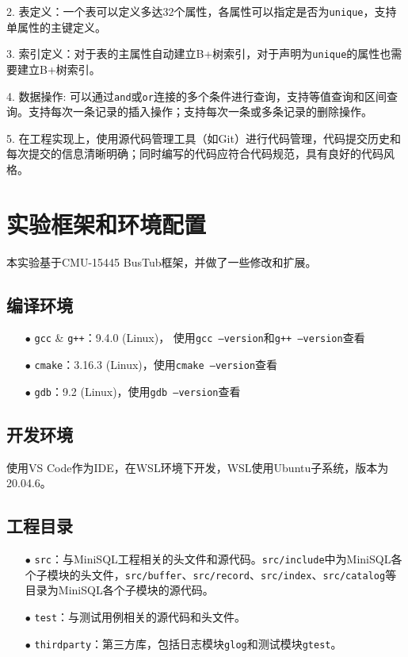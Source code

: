 \documentclass[12pt]{article}
\begin{document}
    2. 表定义：一个表可以定义多达32个属性，各属性可以指定是否为\texttt{unique}，支持单属性的主键定义。

    3. 索引定义：对于表的主属性自动建立B+树索引，对于声明为\texttt{unique}的属性也需要建立B+树索引。

    4. 数据操作: 可以通过\texttt{and}或\texttt{or}连接的多个条件进行查询，支持等值查询和区间查询。支持每次一条记录的插入操作；支持每次一条或多条记录的删除操作。

    5. 在工程实现上，使用源代码管理工具（如Git）进行代码管理，代码提交历史和每次提交的信息清晰明确；同时编写的代码应符合代码规范，具有良好的代码风格。

    \section{实验框架和环境配置}
    本实验基于CMU-15445 BusTub框架，并做了一些修改和扩展。
    
    \subsection{编译环境}
    \begin{itemize}
        \item[$\bullet$] \texttt{gcc} \& \texttt{g++}：9.4.0 (Linux)， 使用\texttt{gcc --version}和\texttt{g++ --version}查看
        \item[$\bullet$] \texttt{cmake}：3.16.3 (Linux)，使用\texttt{cmake --version}查看
        \item[$\bullet$] \texttt{gdb}：9.2 (Linux)，使用\texttt{gdb --version}查看
    \end{itemize}
    
    \subsection{开发环境}
    使用VS Code作为IDE，在WSL环境下开发，WSL使用Ubuntu子系统，版本为20.04.6。

    \subsection{工程目录}
    \begin{itemize}
        \item[$\bullet$] \texttt{src}：与MiniSQL工程相关的头文件和源代码。\texttt{src/include}中为MiniSQL各个子模块的头文件，\texttt{src/buffer}、\texttt{src/record}、\texttt{src/index}、\texttt{src/catalog}等目录为MiniSQL各个子模块的源代码。
        \item[$\bullet$] \texttt{test}：与测试用例相关的源代码和头文件。
        \item[$\bullet$] \texttt{thirdparty}：第三方库，包括日志模块\texttt{glog}和测试模块\texttt{gtest}。
    \end{itemize}
\end{document}
